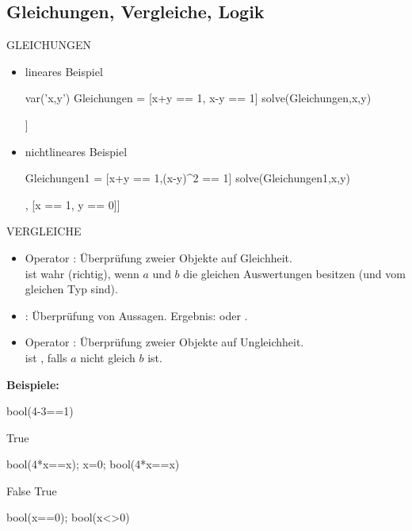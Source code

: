 \documentclass[fontsize=12pt,paper=a4,twoside,bibtotoc,idxtotoc,
liststotoc,pagesize,BCOR1.2cm,DIV15,chapterprefix,pagesize=pdftex]{scrbook}
\begin{document}
\subsection{Gleichungen, Vergleiche, Logik}
GLEICHUNGEN
    \begin{itemize}
	\item lineares Beispiel
	\begin{sagein}
	var('x,y')
	Gleichungen = [x+y == 1, x-y == 1]
	solve(Gleichungen,x,y)
	\end{sagein}
	\begin{sage}
	  [[x == 1, y == 0]]
	\end{sage}
	\item nichtlineares Beispiel
	\begin{sagein}
	Gleichungen1 = [x+y == 1,(x-y)^2 == 1]
	solve(Gleichungen1,x,y)
	\end{sagein}
	\begin{sage}
	  [[x == 0, y == 1], [x == 1, y == 0]]
	\end{sage}
	\end{itemize}
VERGLEICHE
        \begin{itemize}
	\item Operator {\color{blue} \isage{==}}: Überprüfung zweier Objekte auf Gleichheit.\\
	 ist wahr (richtig), wenn $a$ und $b$ die gleichen Auswertungen
	besitzen (und vom gleichen Typ sind). 
	\item {\color{blue} }: Überprüfung von Aussagen. Ergebnis:  oder
	.
	\item Operator {\color{blue} \isage{<>}}:  Überprüfung zweier Objekte auf Ungleichheit. \\
	 ist , falls $a$ nicht gleich $b$
	ist. 
	\end{itemize}
        \textbf{Beispiele:}
	   \begin{sagein}
		bool(4-3==1)
		\end{sagein}
		\begin{sage}
		  True
		\end{sage}
	   \begin{sagein}
		bool(4*x==x); x=0; bool(4*x==x)
		\end{sagein}
		\begin{sage}
		False
		True
		\end{sage}
	    \begin{sagein}
		bool(x==0); bool(x<>0)
		\end{sagein}
\end{document}
